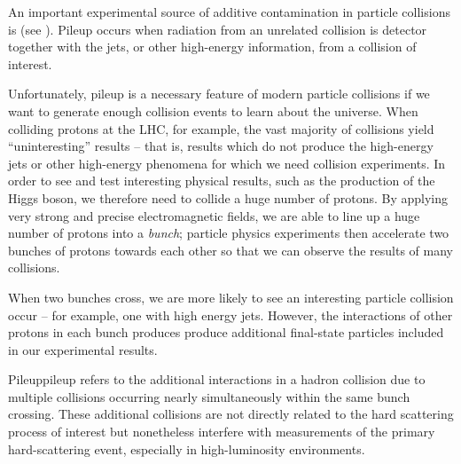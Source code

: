 \begin{subappendices}
An important experimental source of additive contamination in particle collisions is  (see ).
%
Pileup occurs when radiation from an unrelated collision is detector together with the jets, or other high-energy information, from a collision of interest.

Unfortunately, pileup is a necessary feature of modern particle collisions if we want to generate enough collision events to learn about the universe.
%
When colliding protons at the LHC, for example, the vast majority of collisions yield ``uninteresting'' results -- that is, results which do not produce the high-energy jets or other high-energy phenomena for which we need collision experiments.
%
In order to see and test interesting physical results, such as the production of the Higgs boson, we therefore need to collide a huge number of protons.
%
By applying very strong and precise electromagnetic fields, we are able to line up a huge number of protons into a \textit{bunch};
%
particle physics experiments then accelerate two bunches of protons towards each other so that we can observe the results of many collisions.

When two bunches cross, we are more likely to see an interesting particle collision occur -- for example, one with high energy jets.
%
However, the interactions of other protons in each bunch produces produce additional final-state particles included in our experimental results.


\begin{definitionbox}{Pileup}{pileup}
     refers to the additional interactions in a hadron collision due to multiple collisions occurring nearly simultaneously within the same bunch crossing.
    These additional collisions are not directly related to the hard scattering process of interest but nonetheless interfere with measurements of the primary hard-scattering event, especially in high-luminosity environments.
\end{definitionbox}



\end{subappendices}
